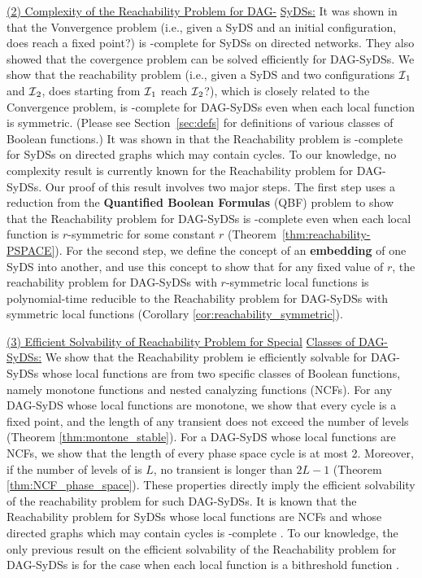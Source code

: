 \smallskip

\noindent
\underline{(2) Complexity of the Reachability Problem for DAG-}\newline
\underline{SyDSs:} 
It was shown in
\cite{Chistikov-etal-2020} that the Vonvergence problem
(i.e., given a SyDS \cals{} and an initial configuration,
does \cals{} reach a fixed point?) is \cpsp-complete
for SyDSs on directed networks.
They also showed that the covergence problem can be solved efficiently
for DAG-SyDSs.
We show that the reachability problem
(i.e., given a SyDS \cals{} and two configurations $\mbox{$\mathcal{I}$}_1$ and $\mbox{$\mathcal{I}$}_2$,
does \cals{} starting from $\mbox{$\mathcal{I}$}_1$ reach $\mbox{$\mathcal{I}$}_2$?),
which is closely related
to the Convergence problem, is \cpsp-complete for DAG-SyDSs even
when each local function is symmetric.
(Please see Section~\ref{sec:defs} for definitions of various classes
of Boolean functions.)
It was shown in \cite{OU-2017} that the Reachability
problem is \cpsp-complete for SyDSs on directed graphs 
which may contain cycles.
To our knowledge, no complexity result is currently known for
the Reachability problem for DAG-SyDSs.
Our proof of this result involves two major steps.
The first step uses a reduction from the \textbf{Quantified Boolean Formulas}
(QBF) problem \cite{GJ-1979} to show that the Reachability problem for DAG-SyDSs is
\cpsp-complete even when each local function is $r$-symmetric for 
some constant $r$ (Theorem~\ref{thm:reachability-PSPACE}).
For the second step,
we define the concept of an \textbf{embedding} of one SyDS into another,
and use this concept to show that
for any fixed value of $r$, 
the reachability problem for DAG-SyDSs with $r$-symmetric local functions 
is polynomial-time reducible to the Reachability problem for DAG-SyDSs with
symmetric  local functions (Corollary \ref{cor:reachability_symmetric}).

\smallskip

\noindent
\underline{(3) Efficient Solvability of Reachability Problem for Special}\newline
\underline{Classes of DAG-SyDSs:} 
We show that the Reachability problem ie efficiently solvable for
DAG-SyDSs whose local functions are from two specific
classes of Boolean functions, namely monotone functions and
nested canalyzing functions (NCFs).
For any DAG-SyDS whose local functions are monotone,
we show that every cycle is a fixed point, 
and the length of any transient does not exceed the number of levels
(Theorem \ref{thm:montone_stable}).
For a DAG-SyDS \cals{} whose local functions are NCFs, we show
that the length of every phase space cycle is at most 2.
Moreover, if the number of levels of  \cals{} is $L$,
no transient is longer than $2L-1$
(Theorem \ref{thm:NCF_phase_space}).
These properties
directly imply the efficient solvability of the reachability
problem for such DAG-SyDSs.
It is known that the Reachability problem for SyDSs whose local
functions are NCFs and whose directed graphs which may contain cycles  
is \cpsp-complete \cite{Rosenkrantz-etal-2018}.
To our knowledge, the only previous result on the efficient
solvability of the  Reachability problem for DAG-SyDSs is
for the case when each local function is a bithreshold
function \cite{KKM+2013}.

